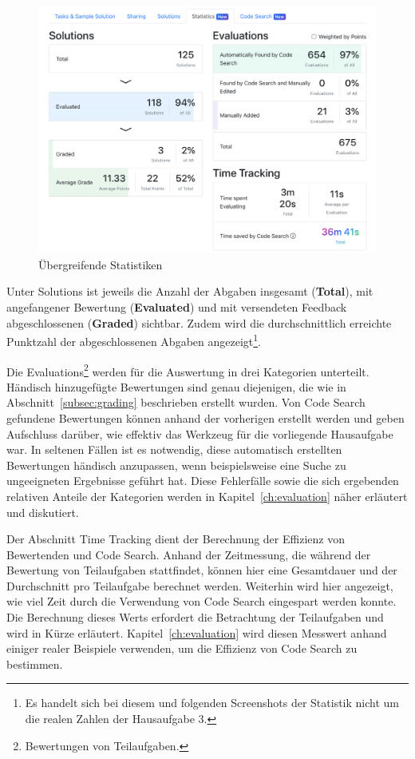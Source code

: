 \begin{figure}
    \centering
    \includegraphics[width=\textwidth]{images/assignment-statistics-basics}
    \caption{Übergreifende Statistiken}
    \label{fig:assignment-statistics-basics}
\end{figure}

Unter Solutions ist jeweils die Anzahl der Abgaben insgesamt (\textbf{Total}), mit angefangener Bewertung (\textbf{Evaluated}) und mit versendeten Feedback abgeschlossenen (\textbf{Graded}) sichtbar.
Zudem wird die durchschnittlich erreichte Punktzahl der abgeschlossenen Abgaben angezeigt\footnote{
    Es handelt sich bei diesem und folgenden Screenshots der Statistik nicht um die realen Zahlen der Hausaufgabe 3.
}.

Die Evaluations\footnote{
    Bewertungen von Teilaufgaben.
} werden für die Auswertung in drei Kategorien unterteilt.
Händisch hinzugefügte Bewertungen sind genau diejenigen, die wie in Abschnitt~\ref{subsec:grading} beschrieben erstellt wurden.
Von Code Search gefundene Bewertungen können anhand der vorherigen erstellt werden und geben Aufschluss darüber, wie effektiv das Werkzeug für die vorliegende Hausaufgabe war.
In seltenen Fällen ist es notwendig, diese automatisch erstellten Bewertungen händisch anzupassen, wenn beispielsweise eine Suche zu ungeeigneten Ergebnisse geführt hat.
Diese Fehlerfälle sowie die sich ergebenden relativen Anteile der Kategorien werden in Kapitel~\ref{ch:evaluation} näher erläutert und diskutiert.

Der Abschnitt Time Tracking dient der Berechnung der Effizienz von Bewertenden und Code Search.
Anhand der Zeitmessung, die während der Bewertung von Teilaufgaben stattfindet, können hier eine Gesamtdauer und der Durchschnitt pro Teilaufgabe berechnet werden.
Weiterhin wird hier angezeigt, wie viel Zeit durch die Verwendung von Code Search eingespart werden konnte.
Die Berechnung dieses Werts erfordert die Betrachtung der Teilaufgaben und wird in Kürze erläutert.
Kapitel~\ref{ch:evaluation} wird diesen Messwert anhand einiger realer Beispiele verwenden, um die Effizienz von Code Search zu bestimmen.

